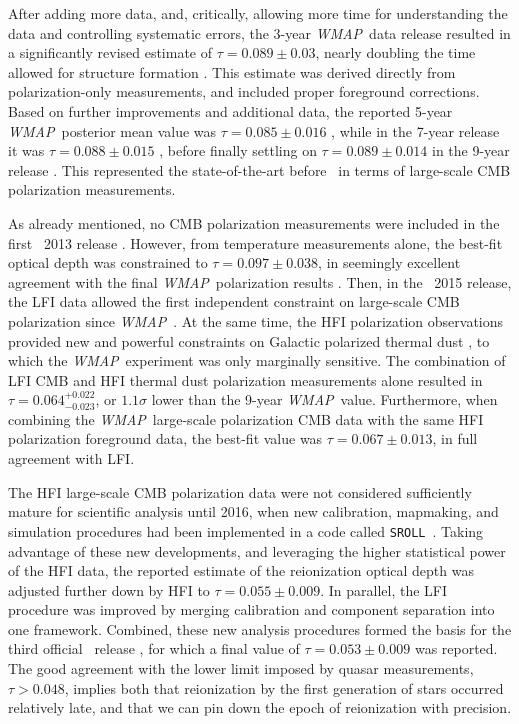 \documentclass[onecolumn]{aa}
\def\WMAP{\emph{WMAP}}
\newcommand{\sroll}[0]{\texttt{SROLL}}
\begin{document}
After adding more data, and, critically, allowing more time for
understanding the data and controlling systematic errors, the 3-year
\WMAP\ data release resulted in a significantly revised estimate of
$\tau=0.089\pm0.03$, nearly doubling the time allowed for structure
formation \citep{page2007}. This estimate was derived directly from
polarization-only measurements, and included proper foreground
corrections. Based on further improvements and additional data, the
reported 5-year \WMAP\ posterior mean value was $\tau=0.085\pm0.016$
\citep{komatsu2009}, while in the 7-year release it was
$\tau=0.088\pm0.015$ \citep{larson2010}, before finally settling on
$\tau=0.089\pm0.014$ in the 9-year release \citep{hinshaw2012}. This
represented the state-of-the-art before \Planck\ in terms of
large-scale CMB polarization measurements.

As already mentioned, no CMB polarization measurements were included
in the first \Planck\ 2013 release \citep{planck2013-p01}. However,
from temperature measurements alone, the best-fit optical depth was
constrained to $\tau=0.097\pm0.038$, in seemingly excellent
agreement with the final \WMAP\ polarization results
\citep{planck2013-p11}. Then, in the \Planck\ 2015 release, the LFI
data allowed the first independent constraint on large-scale CMB
polarization since \WMAP\ \citep{planck2014-a13}. At the same time,
the HFI polarization observations provided new and powerful
constraints on Galactic polarized thermal dust \citep{planck2014-a12},
to which the \WMAP\ experiment was only marginally sensitive. The
combination of LFI CMB and HFI thermal dust polarization measurements
alone resulted in $\tau=0.064^{+0.022}_{-0.023}$, or $1.1\sigma$ lower
than the 9-year \WMAP\ value. Furthermore, when combining the
\WMAP\ large-scale polarization CMB data with the same HFI polarization
foreground data, the best-fit value was $\tau=0.067\pm0.013$, in full agreement
with LFI.

The HFI large-scale CMB polarization data were not considered
sufficiently mature for scientific analysis until 2016, when new
calibration, mapmaking, and simulation procedures had been implemented
in a code called \sroll\ \citep{Planck_PIP_XLVIII}. Taking advantage
of these new developments, and leveraging the higher statistical power
of the HFI data, the reported estimate of the reionization optical
depth was adjusted further down by HFI to $\tau=0.055\pm0.009$. In
parallel, the LFI procedure was improved by merging calibration and
component separation into one framework.  Combined, these new analysis
procedures formed the basis for the third official
\Planck\ release \citep{planck2016-l01}, for which a final value of
$\tau=0.053\pm0.009$ was reported. The good agreement with the lower
limit imposed by quasar measurements, $\tau > 0.048$, implies both
that reionization by the first generation of stars occurred relatively
late, and that we can pin down the epoch of reionization with
precision.
\end{document}
